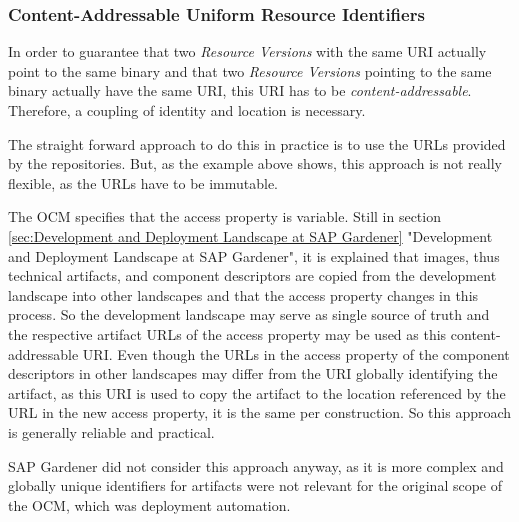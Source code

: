 \subsubsection{Content-Addressable Uniform Resource Identifiers}
In order to guarantee that two \emph{Resource Versions} with the same URI actually point to the same binary and that two \emph{Resource Versions} pointing to the same binary actually have the same URI, this URI has to be \emph{content-addressable}. Therefore, a coupling of identity and location is necessary.\par 
The straight forward approach to do this in practice is to use the URLs provided by the repositories. But, as the example above shows, this approach is not really flexible, as the URLs have to be immutable.\par 
The OCM specifies that the access property is variable. Still in section \ref{sec:Development and Deployment Landscape at SAP Gardener} "Development and Deployment Landscape at SAP Gardener", it is explained that images, thus technical artifacts, and component descriptors are copied from the development landscape into other landscapes and that the access property changes in this process. So the development landscape may serve as single source of truth and the respective artifact URLs of the access property may be used as this content-addressable URI. Even though the URLs in the access property of the component descriptors in other landscapes may differ from the URI globally identifying the artifact, as this URI is used to copy the artifact to the location referenced by the URL in the new access property, it is the same per construction. So this approach is generally reliable and practical.\par
SAP Gardener did not consider this approach anyway, as it is more complex and globally unique identifiers for artifacts were not relevant for the original scope of the OCM, which was deployment automation. 


